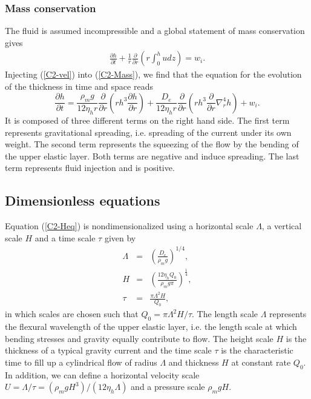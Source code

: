 \subsubsection*{Mass conservation}

The fluid  is assumed  incompressible and a  global statement  of mass
conservation gives
\begin{eqnarray}
  \frac{\partial         h}{\partial        t} +\frac{1}{r}
  \frac{\partial}{\partial
  r} \left( r\int_0^hudz\right) = w_i.
  \label{C2-Mass}
\end{eqnarray}
Injecting  (\ref{C2-vel})  into  (\ref{C2-Mass}),  we  find  that  the
equation for the evolution of the thickness in time and space reads
\begin{equation}
  \frac{\partial h}{\partial t} =\frac{\rho_mg}{12 \eta_h r}
  \frac{\partial}{\partial r}  \left( rh^3  \frac{\partial h}{\partial
      r}\right)+\frac{D_e}{12\eta_h r}\frac{\partial}{\partial r} \left( rh^3 \frac{\partial}{\partial r}\nabla_r^4h\right)+
  w_i .\label{C2-Heq}
\end{equation}
It is  composed of three different  terms on the right  hand side. The
first term represents gravitational  spreading, i.e.  spreading of the
current under its own weight. The second term represents the squeezing
of the flow by the bending of the upper elastic layer.  Both terms are negative and
induce spreading.   The last term  represents fluid injection  and is
positive.

\subsection{Dimensionless equations}
\label{C2-sec:dimens-equat}

Equation (\ref{C2-Heq}) is nondimensionalized using a horizontal scale
$\Lambda$, a vertical scale $H$ and a time scale $\tau$ given by
\begin{eqnarray}
  \Lambda &=& \left(\frac{D_e}{\rho_m g}\right)^{1/4},\label{C2-L1}\\
  H&=&\left       (\frac{12\eta_h      Q_{0}}{\rho_{m}g       \pi}\right      )
       ^{\frac{1}{4}} ,\label{C2-H1}\\
  \tau&=&\frac{\pi \Lambda^{2} H}{Q_{0}},\label{C2-T1}
\end{eqnarray}
in which scales are chosen such  that $Q_0 = \pi\Lambda^2 H/\tau$. The
length scale $\Lambda$ represents the flexural wavelength of the upper
elastic layer,  i.e. the  length scale at  which bending  stresses and
gravity  equally contribute  to flow.   The  height scale  $H$ is  the
thickness of  a typical gravity current  and the time scale  $\tau$ is
the  characteristic time  to  fill  up a  cylindrical  flow of  radius
$\Lambda$ and thickness  $H$ at constant rate $Q_0$.   In addition, we
can       define        a       horizontal        velocity       scale
$U=\Lambda/\tau=\left(\rho_m           g           H^3\right)/\left(12
  \eta_h\Lambda\right)$ and a pressure scale $\rho_m g H$.

